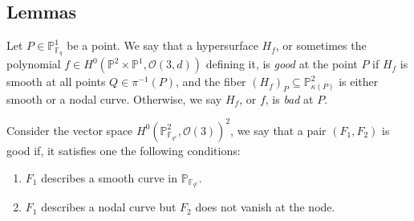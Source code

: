 \documentclass[12pt]{article}
\theoremstyle{plain}
\theoremstyle{definition}
\newcommand{\IF}{\mathbb{F}}
\newcommand{\IP}{\mathbb{P}}
\newcommand{\sO}{\mathcal{O}}
\newcommand{\<}{\langle}
\renewcommand{\>}{\rangle}
\begin{document}
\subsection{Lemmas}
Let $P \in \IP^1_{\IF_q}$ be a point. We say that a hypersurface $H_f$, or sometimes the polynomial $f \in H^0(\IP^2 \times \IP^1, \sO(3, d))$ defining it, is \textit{good} at the point $P$ if $H_f$ is smooth at all points $Q \in \pi^{-1}(P)$, and the fiber $(H_f)_P \subseteq \IP^2_{\kappa(P)}$ is either smooth or a nodal curve. Otherwise, we say $H_f$, or $f$, is \textit{bad} at $P$.  

Consider the vector space $H^0(\IP^2_{\IF_{q^e}}, \sO(3))^2$, we say that a pair $(F_1, F_2)$ is good if, it satisfies one the following conditions:
\begin{enumerate}
\item $F_1$ describes a smooth curve in $\IP_{\IF_{q^e}}$.
\item $F_1$ describes a nodal curve but $F_2$ does not vanish at the node.
\end{enumerate}  
\end{document}

